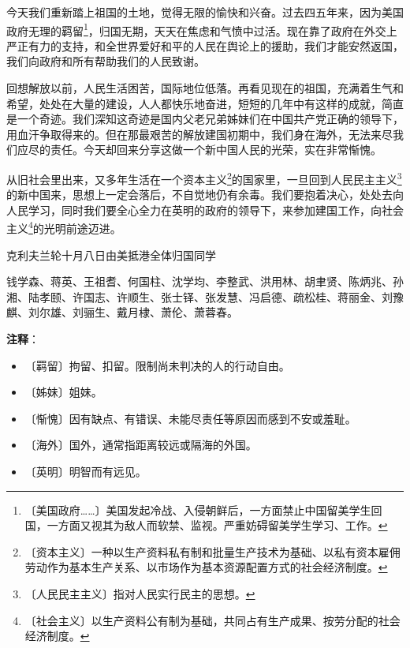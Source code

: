 \documentclass[12pt,UTF-8,openany]{ctexbook}
\begin{document}
\begin{Large}
    
    今天我们重新踏上祖国的土地，觉得无限的愉快和兴奋。过去四五年来，因为美国政府无理的羁留\footnote{〔美国政府……〕美国发起冷战、入侵朝鲜后，一方面禁止中国留美学生回国，一方面又视其为敌人而软禁、监视。严重妨碍留美学生学习、工作。}，归国无期，天天在焦虑和气愤中过活。现在靠了政府在外交上严正有力的支持，和全世界爱好和平的人民在舆论上的援助，我们才能安然返国，我们向政府和所有帮助我们的人民致谢。
    
    回想解放以前，人民生活困苦，国际地位低落。再看见现在的祖国，充满着生气和希望，处处在大量的建设，人人都快乐地奋进，短短的几年中有这样的成就，简直是一个奇迹。我们深知这奇迹是国内父老兄弟姊妹们在中国共产党正确的领导下，用血汗争取得来的。但在那最艰苦的解放建国初期中，我们身在海外，无法来尽我们应尽的责任。今天却回来分享这做一个新中国人民的光荣，实在非常惭愧。
    
    从旧社会里出来，又多年生活在一个资本主义\footnote{〔资本主义〕一种以生产资料私有制和批量生产技术为基础、以私有资本雇佣劳动作为基本生产关系、以市场作为基本资源配置方式的社会经济制度。}的国家里，一旦回到人民民主主义\footnote{〔人民民主主义〕指对人民实行民主的思想。}的新中国来，思想上一定会落后，不自觉地仍有余毒。我们要抱着决心，处处去向人民学习，同时我们要全心全力在英明的政府的领导下，来参加建国工作，向社会主义\footnote{〔社会主义〕以生产资料公有制为基础，共同占有生产成果、按劳分配的社会经济制度。}的光明前途迈进。
    
    \hfill 克利夫兰轮十月八日由美抵港全体归国同学
    
    \hfill 钱学森、蒋英、王祖耆、何国柱、沈学均、李整武、洪用林、胡聿贤、陈炳兆、孙湘、陆孝颐、许国志、许顺生、张士铎、张发慧、冯启德、疏松桂、蒋丽金、刘豫麒、刘尔雄、刘骊生、戴月棣、萧伦、萧蓉春。
    
\end{Large}


\newpage

\textbf{注释}：

\vspace{-1em}

\begin{itemize}
    \setlength\itemsep{-0.2em}
    \item 〔羁留〕拘留、扣留。限制尚未判决的人的行动自由。
    \item 〔姊妹〕姐妹。
    \item 〔惭愧〕因有缺点、有错误、未能尽责任等原因而感到不安或羞耻。
    \item 〔海外〕国外，通常指距离较远或隔海的外国。
    \item 〔英明〕明智而有远见。
\end{itemize}
\end{document}
